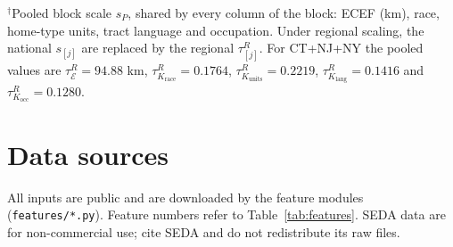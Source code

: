 \documentclass[11pt]{article}
\begin{document}
\endgroup
\noindent$^\dagger$Pooled block scale $s_P$, shared by every column of the block: ECEF (km),
race, home-type units, tract language and occupation. Under regional scaling, the national
$s_{[j]}$ are replaced by the regional $\tau^R_{[j]}$. For CT+NJ+NY the pooled values are
$\tau^R_{\mathcal E}=94.88$ km, $\tau^R_{K_{\text{race}}}=0.1764$,
$\tau^R_{K_{\text{units}}}=0.2219$, $\tau^R_{K_{\text{lang}}}=0.1416$ and
$\tau^R_{K_{\text{occ}}}=0.1280$.

\section{Data sources}\label{sec:sources}

All inputs are public and are downloaded by the feature modules (\texttt{features/*.py}).
Feature numbers refer to Table~\ref{tab:features}. SEDA data are for non-commercial use;
cite SEDA and do not redistribute its raw files.
\end{document}
